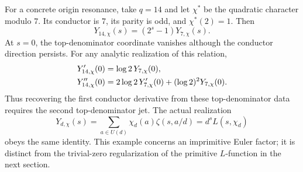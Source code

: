 For a concrete origin resonance, take \(q=14\) and let \(\chi^*\)
be the quadratic character modulo \(7\). Its conductor is \(7\),
its parity is odd, and \(\chi^*(2)=1\). Then
\begin{equation}
 Y_{14,\chi}(s)=(2^s-1)Y_{7,\chi}(s).
 \label{dist:eq:dist-resonance-example}
\end{equation}
At \(s=0\), the top-denominator coordinate vanishes although the
conductor direction persists. For any analytic realization of
this relation,
\begin{align}
 Y_{14,\chi}'(0)&=\log2\,Y_{7,\chi}(0),\notag\\
 Y_{14,\chi}''(0)&=
 2\log2\,Y_{7,\chi}'(0)+(\log2)^2Y_{7,\chi}(0).
 \label{dist:eq:dist-resonance-example-jets}
\end{align}
Thus recovering the first conductor derivative from these
top-denominator data requires the second top-denominator jet.
The actual realization
\[
 Y_{d,\chi}(s)
 =\sum_{a\in U(d)}\chi_d(a)\zeta(s,a/d)
 =d^sL(s,\chi_d)
\]
obeys the same identity. This example concerns an imprimitive
Euler factor; it is distinct from the trivial-zero regularization
of the primitive \(L\)-function in the next section.


